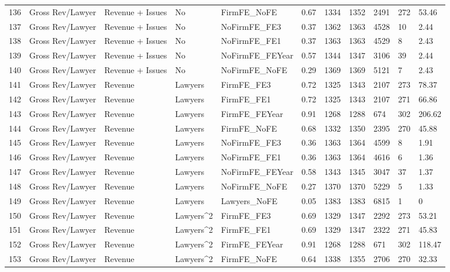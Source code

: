 \documentclass{article}
\begin{document}
\begin{table}[H]
\begin{tabular}{rllllllllll}
  136 & Gross Rev/Lawyer & Revenue + Issues & No & FirmFE\_NoFE & 0.67 & 1334 & 1352 & 2491 & 272 & 53.46 \\ 
  137 & Gross Rev/Lawyer & Revenue + Issues & No & NoFirmFE\_FE3 & 0.37 & 1362 & 1363 & 4528 & 10 & 2.44 \\ 
  138 & Gross Rev/Lawyer & Revenue + Issues & No & NoFirmFE\_FE1 & 0.37 & 1363 & 1363 & 4529 & 8 & 2.43 \\ 
  139 & Gross Rev/Lawyer & Revenue + Issues & No & NoFirmFE\_FEYear & 0.57 & 1344 & 1347 & 3106 & 39 & 2.44 \\ 
  140 & Gross Rev/Lawyer & Revenue + Issues & No & NoFirmFE\_NoFE & 0.29 & 1369 & 1369 & 5121 & 7 & 2.43 \\ 
  141 & Gross Rev/Lawyer & Revenue & Lawyers & FirmFE\_FE3 & 0.72 & 1325 & 1343 & 2107 & 273 & 78.37 \\ 
  142 & Gross Rev/Lawyer & Revenue & Lawyers & FirmFE\_FE1 & 0.72 & 1325 & 1343 & 2107 & 271 & 66.86 \\ 
  143 & Gross Rev/Lawyer & Revenue & Lawyers & FirmFE\_FEYear & 0.91 & 1268 & 1288 & 674 & 302 & 206.62 \\ 
  144 & Gross Rev/Lawyer & Revenue & Lawyers & FirmFE\_NoFE & 0.68 & 1332 & 1350 & 2395 & 270 & 45.88 \\ 
  145 & Gross Rev/Lawyer & Revenue & Lawyers & NoFirmFE\_FE3 & 0.36 & 1363 & 1364 & 4599 & 8 & 1.91 \\ 
  146 & Gross Rev/Lawyer & Revenue & Lawyers & NoFirmFE\_FE1 & 0.36 & 1363 & 1364 & 4616 & 6 & 1.36 \\ 
  147 & Gross Rev/Lawyer & Revenue & Lawyers & NoFirmFE\_FEYear & 0.58 & 1343 & 1345 & 3047 & 37 & 1.37 \\ 
  148 & Gross Rev/Lawyer & Revenue & Lawyers & NoFirmFE\_NoFE & 0.27 & 1370 & 1370 & 5229 & 5 & 1.33 \\ 
  149 & Gross Rev/Lawyer & Revenue & Lawyers & Lawyers\_NoFE & 0.05 & 1383 & 1383 & 6815 & 1 & 0 \\ 
  150 & Gross Rev/Lawyer & Revenue & Lawyers^2 & FirmFE\_FE3 & 0.69 & 1329 & 1347 & 2292 & 273 & 53.21 \\ 
  151 & Gross Rev/Lawyer & Revenue & Lawyers^2 & FirmFE\_FE1 & 0.69 & 1329 & 1347 & 2322 & 271 & 45.83 \\ 
  152 & Gross Rev/Lawyer & Revenue & Lawyers^2 & FirmFE\_FEYear & 0.91 & 1268 & 1288 & 671 & 302 & 118.47 \\ 
  153 & Gross Rev/Lawyer & Revenue & Lawyers^2 & FirmFE\_NoFE & 0.64 & 1338 & 1355 & 2706 & 270 & 32.33 \\ 

\end{tabular}
\end{table}
\end{document}
